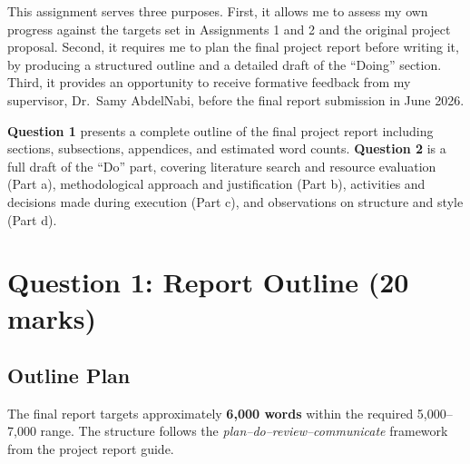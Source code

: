 \documentclass[12pt,a4paper]{article}
\begin{document}
This assignment serves three purposes.  First, it allows me to assess my own progress
against the targets set in Assignments 1 and 2 and the original project proposal.
Second, it requires me to plan the final project report before writing it, by producing a
structured outline and a detailed draft of the ``Doing'' section.  Third, it provides an
opportunity to receive formative feedback from my supervisor, Dr.\ Samy AbdelNabi,
before the final report submission in June 2026.

\textbf{Question 1} presents a complete outline of the final project report including
sections, subsections, appendices, and estimated word counts.  \textbf{Question 2}
is a full draft of the ``Do'' part, covering literature search and resource evaluation
(Part a), methodological approach and justification (Part b), activities and decisions
made during execution (Part c), and observations on structure and style (Part d).

\section{Question 1: Report Outline (20 marks)}

\subsection{Outline Plan}

The final report targets approximately \textbf{6,000 words} within the required
5,000--7,000 range.  The structure follows the \emph{plan--do--review--communicate}
framework from the project report guide.
\end{document}
